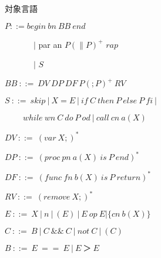\documentclass{jarticle}
\begin{document}
\begin{flushleft}

対象言語

$P ::= begin\ bn\ BB\ end$

\ \ \ \ \ \ \ $|$ par an $P(\parallel P)^+$ $rap$

\ \ \ \ \ \ \ $|$ $S$

$BB\ ::=\ DV\ DP\ DF\ P(;P)^+\ RV$

$S\ ::=\ skip\ |\  X = E\ |\ if\ C\ then\ P\ else\ P\ fi\ |$

$\ \ \ \ \ \ \ \ \ \  while\ wn\ C\ do\ P\ od\ |\ call\ cn\ a(X)$

$DV\ ::=\ (var\ X;)^*$

$DP\ ::=\ (proc\ pn\ a(X)\ is\ P\ end)^*$

$DF\ ::=\ (func\ fn\ b(X)\ is\ P\ return)^*$

$RV\ ::=\ (remove\ X;)^*$

$E\ ::=\ X\ |\ n\ |\ (E)\ |\ E\ op\ E | \{cn\ b(X)\}$

$C\ ::=\ B\ |\ C\ \&\& \ C\ |\ not\ C\ |\ (C)$

$B\ ::=\ E\ ==\ E\ |\ E\ ＞\ E$



\end{flushleft}
\end{document}
